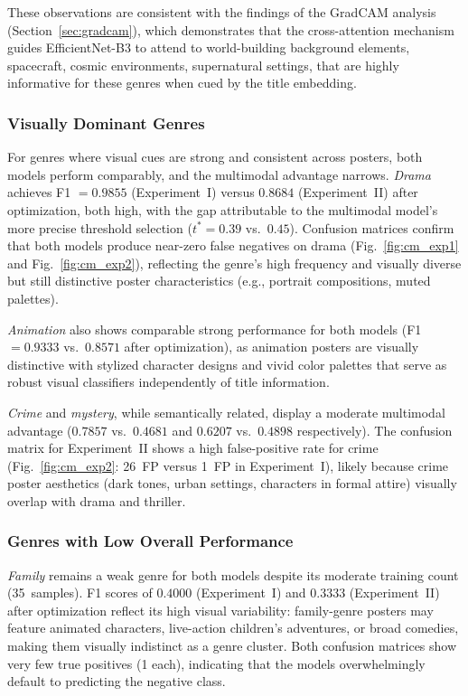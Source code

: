 \documentclass[conference]{IEEEtran}
\begin{document}
These observations are consistent with the findings of the
GradCAM analysis (Section~\ref{sec:gradcam}), which demonstrates
that the cross-attention mechanism guides EfficientNet-B3 to attend
to world-building background elements, spacecraft, cosmic
environments, supernatural settings, that are highly informative
for these genres when cued by the title embedding.

\subsubsection{Visually Dominant Genres}

For genres where visual cues are strong and consistent across posters,
both models perform comparably, and the multimodal advantage narrows.
\textit{Drama} achieves F1 $= 0.9855$ (Experiment~I) versus
$0.8684$ (Experiment~II) after optimization, both high, with the
gap attributable to the multimodal model's more precise threshold
selection ($t^{*} = 0.39$ vs.\ $0.45$). Confusion matrices confirm
that both models produce near-zero false negatives on drama
(Fig.~\ref{fig:cm_exp1} and Fig.~\ref{fig:cm_exp2}), reflecting
the genre's high frequency and visually diverse but still distinctive
poster characteristics (e.g., portrait compositions, muted palettes).

\textit{Animation} also shows comparable strong performance for both
models (F1 $= 0.9333$ vs.\ $0.8571$ after optimization), as
animation posters are visually distinctive with stylized character
designs and vivid color palettes that serve as robust visual
classifiers independently of title information.

\textit{Crime} and \textit{mystery}, while semantically related,
display a moderate multimodal advantage ($0.7857$ vs.\ $0.4681$ and
$0.6207$ vs.\ $0.4898$ respectively). The confusion matrix for
Experiment~II shows a high false-positive rate for crime
(Fig.~\ref{fig:cm_exp2}: 26~FP versus 1~FP in Experiment~I), likely
because crime poster aesthetics (dark tones, urban settings,
characters in formal attire) visually overlap with drama and
thriller.

\subsubsection{Genres with Low Overall Performance}

\textit{Family} remains a weak genre for both models despite its
moderate training count (35~samples). F1 scores of $0.4000$
(Experiment~I) and $0.3333$ (Experiment~II) after optimization
reflect its high visual variability: family-genre posters may
feature animated characters, live-action children's adventures, or
broad comedies, making them visually indistinct as a genre cluster.
Both confusion matrices show very few true positives (1 each),
indicating that the models overwhelmingly default to predicting
the negative class.
\end{document}
